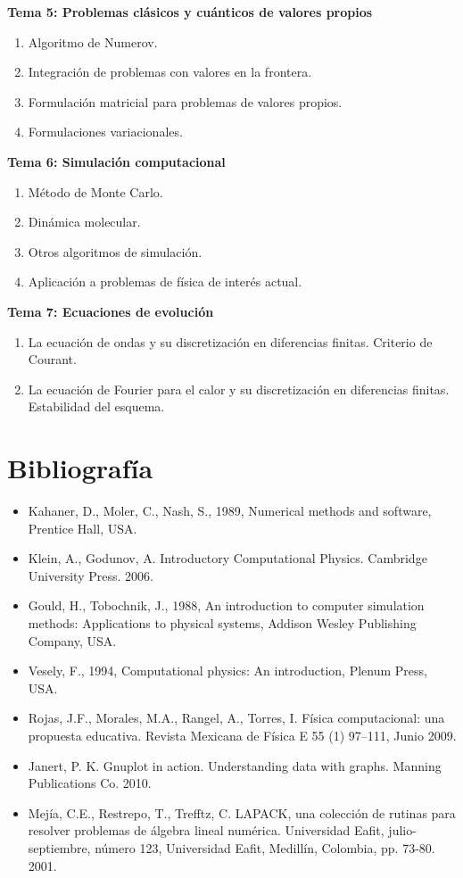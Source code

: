 \documentclass[12pt]{article}
\begin{document}
\textbf{Tema 5: Problemas clásicos y cuánticos de valores propios}
\begin{enumerate}
\item Algoritmo de Numerov.
\item Integración de problemas con valores en la frontera.
\item Formulación matricial para problemas de valores propios.
\item Formulaciones variacionales.
\end{enumerate}
\textbf{Tema 6: Simulación computacional}
\begin{enumerate}
\item Método de Monte Carlo.
\item Dinámica molecular.
\item Otros algoritmos de simulación.
\item Aplicación a problemas de física de interés actual.
\end{enumerate}
\textbf{Tema 7: Ecuaciones de evolución}
\begin{enumerate}
\item La ecuación de ondas y su discretización en diferencias finitas. Criterio de Courant.
\item La ecuación de Fourier para el calor y su discretización en diferencias finitas. Estabilidad del esquema.
\end{enumerate}
\section{Bibliografía}
\begin{itemize}
\item Kahaner, D., Moler, C., Nash, S., 1989, Numerical methods and software, Prentice Hall, USA.
\item Klein, A., Godunov, A. Introductory Computational Physics. Cambridge University Press. 2006.
\item Gould, H., Tobochnik, J., 1988, An introduction to computer simulation methods: Applications to physical systems, Addison Wesley Publishing Company, USA.
\item Vesely, F., 1994, Computational physics: An introduction, Plenum Press, USA.
\item Rojas, J.F., Morales, M.A., Rangel, A., Torres, I. Física computacional: una propuesta educativa. Revista Mexicana de Física E 55 (1) 97–111, Junio 2009.
\item Janert, P. K. Gnuplot in action. Understanding data with graphs. Manning Publications Co. 2010.
\item Mejía, C.E., Restrepo, T., Trefftz, C. LAPACK, una colección de rutinas para resolver problemas de álgebra lineal numérica. Universidad Eafit, julio-septiembre, número 123, Universidad Eafit, Medillín, Colombia, pp. 73-80. 2001.
\end{itemize}
\end{document}
